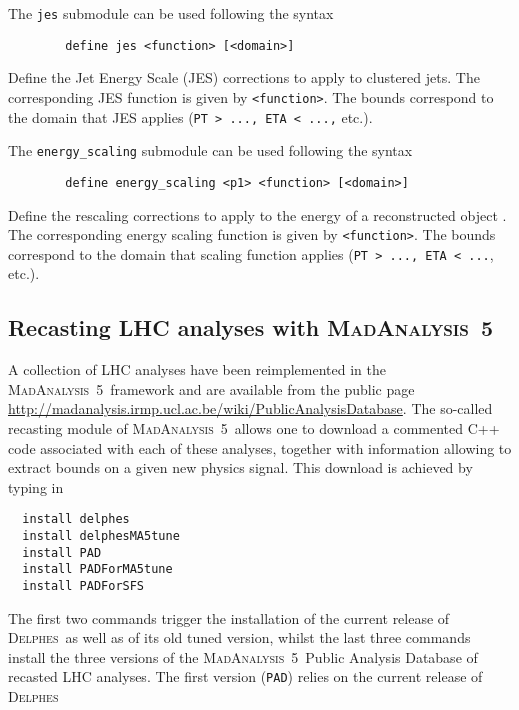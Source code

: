 \documentclass[a4paper]{article}
\newcommand{\MA}{\textsc{MadAnalysis}~5}
\newcommand{\DEL}{\textsc{Delphes}}
\begin{document}
\noindent The \verb+jes+ submodule can be used following the syntax
{\color{ao} \begin{verbatim}
		define jes <function> [<domain>]
\end{verbatim}}
Define the Jet Energy Scale (JES) corrections to apply to clustered jets. The corresponding JES function is given by {\tt <function>}. The bounds correspond to the domain that JES applies ({\tt PT > ..., ETA < ...,} etc.).

\noindent The \verb+energy_scaling+ submodule can be used following the syntax
{\color{ao} \begin{verbatim}
		define energy_scaling <p1> <function> [<domain>]
\end{verbatim}}
Define the rescaling corrections to apply to the energy of a reconstructed object {\tt <p1>}.
The corresponding energy scaling function is given by {\tt <function>}.
The bounds correspond to the domain that scaling function applies ({\tt PT > ..., ETA < ...}, etc.).
\begin{shaded}
\section{\Large Recasting LHC analyses with \MA}
\end{shaded}
A collection of LHC analyses have been reimplemented in the \MA\ framework and
are available from the public page
\href{http://madanalysis.irmp.ucl.ac.be/wiki/PublicAnalysisDatabase}
{http://madanalysis.irmp.ucl.ac.be/wiki/PublicAnalysisDatabase}. The so-called
recasting module of \MA\ allows one to download a commented C++ code associated
with each of these analyses, together with information allowing to extract
bounds on a given new physics signal. This download is achieved by typing in
{\color{ao} \begin{verbatim}
  install delphes
  install delphesMA5tune
  install PAD
  install PADForMA5tune
  install PADForSFS
\end{verbatim}}
\noindent The first two commands trigger the installation of the current release
of \DEL\ as well as of its old tuned version, whilst the last three commands
install the three versions of the \MA\ Public Analysis Database of recasted LHC
analyses. The first version ({\tt PAD}) relies on the current release of \DEL\
\end{document}
